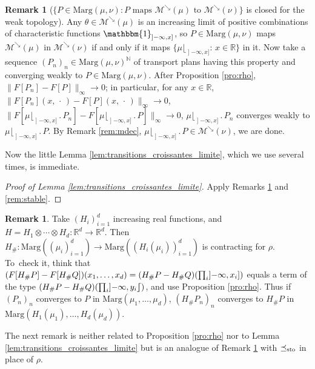 \documentclass[JEP,XML,SOM,Unicode,NoEqCountersInSection,NoFloatCountersInSection,published]{cedram}
\newcommand{\ldot}{\mathbin{.}}
\theoremstyle{plain}
\theoremstyle{definition}
\newtheorem{rem}[them]{Remark}
\newcommand{\one}{\mathbbm{1}}
\newcommand{\ma}{\mathrm{Marg}}
\newcommand{\R}{\mathbb{R}}
\newcommand{\N}{\mathbb{N}}
\newcommand{\leqs}{\preceq_{\text{\rm sto}}}
\newcommand{\mdec}{\mathcal{M}^{\scriptscriptstyle\searrow}}
\newcommand{\op}{\mathopen}
\newcommand{\rsemibracket}{\mathclose{\rfloor\hspace*{-.9ex}\lceil}}
\begin{document}

\begin{rem}[$\{P\in\ma(\mu,\nu):P\text{ maps } \mdec(\mu)\text{ to }\mdec(\nu)\}$ is closed for the weak topology]\label{rem:preserver_mdec_ferme}
Any $\theta\in\mdec(\mu)$ is an increasing limit of positive combinations of characteristic functions $\one_{\op]-\infty,x]}$, so $P\in\ma(\mu,\nu)$ maps $\mdec(\mu)$ in $\mdec(\nu)$ if and only if it maps $\{\mu\lfloor_{\op]-\infty,x]}:\,x\in\R\}$ in it. Now take a sequence $(P_n)_n\in\ma(\mu,\nu)^\N$ of transport plans having this property and converging weakly to $P\in\ma(\mu,\nu)$. After Proposition \ref{pro:rho}, $\|F[P_n]-F[P]\|_\infty\to0$; in particular, for any $x\in\R$, $\|F[P_n](x,\,\cdot\,)-F[P](x,\,\cdot\,)\|_\infty\to0$, \ie $\|F[\mu\lfloor_{\op]-\infty,x]}{}\ldot P_n]-F[\mu\lfloor_{\op]-\infty,x]}{}\ldot P]\|_\infty\to0$, \ie $\mu\lfloor_{\op]-\infty,x]}{}\ldot P_n$ converges weakly to $\mu\lfloor_{\op]-\infty,x]}{}\ldot P$. By Remark \ref{rem:mdec}, $\mu\lfloor_{\op]-\infty,x]}{}\ldot P\in\mdec(\nu)$, we are done.
\end{rem}

Now the little Lemma \ref{lem:transitions_croissantes_limite}, which we use several times, is immediate.

\begin{proof}[Proof of Lemma \ref{lem:transitions_croissantes_limite}]\label{proof:lem:transitions_croissantes_limite} Apply Remarks \ref{rem:preserver_mdec_ferme} and \ref{rem:stable}.
\end{proof}

\begin{rem}\label{rem:diese_contractant} Take $(H_i)_{i=1}^d$ increasing real functions, and $H=H_1\otimes\cdots\otimes H_d:\R^d\to\R^d$. Then $H_\#:\ma((\mu_i)_{i=1}^d )\to\ma((H_i(\mu_i))_{i=1}^d)$ is contracting for $\rho$. To~check it, think that $(F[H_\#P]-F[H_\#Q])(x_1,\ldots,x_d)=(H_\#P\linebreak[2]-H_\#Q)(\prod_i\op]-\infty,x_i])$ equals a term of the type $(H_\#P-H_\#Q)(\prod_i\op]-\infty,y_i\rsemibracket)$, and use Proposition \ref{pro:rho}. Thus if $(P_n)_n$ converges to $P$ in $\ma(\mu_1,\ldots,\mu_d)$, $(H_\#P_n)_n$ converges to $H_\#P$ in $\ma(H_1(\mu_1),\ldots, H_d(\mu_d))$.
\end{rem}

The next remark is neither related to Proposition \ref{pro:rho} nor to Lemma \ref{lem:transitions_croissantes_limite} but is an analogue of Remark \ref{rem:diese_contractant} with $\leqs$ in place of $\rho$.
\end{document}
